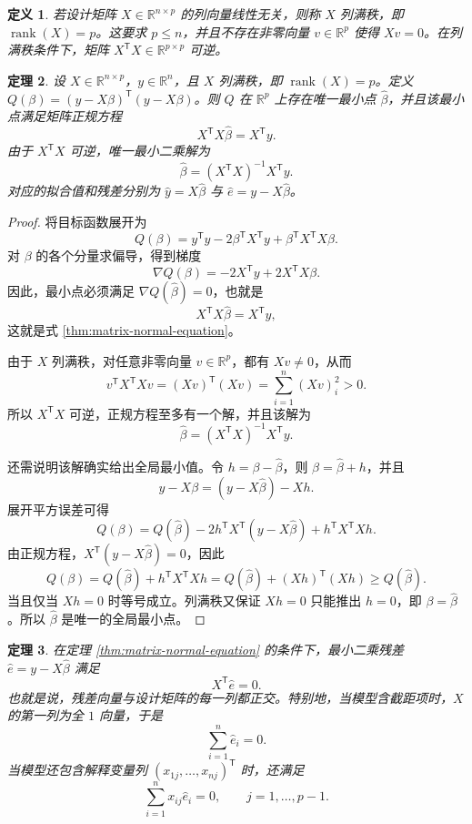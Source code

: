 \documentclass[UTF8,fontset=fandol,11pt]{ctexart}
\newtheorem{definition}{定义}[section]
\newtheorem{theorem}[definition]{定理}
\begin{document}
\begin{definition}
若设计矩阵 $X\in\mathbb{R}^{n\times p}$ 的列向量线性无关，则称 $X$ 列满秩，即 $\operatorname{rank}(X)=p$。这要求 $p\leq n$，并且不存在非零向量 $v\in\mathbb{R}^{p}$ 使得 $Xv=0$。在列满秩条件下，矩阵 $X^{\mathsf T}X\in\mathbb{R}^{p\times p}$ 可逆。
\end{definition}
\begin{theorem}
\label{thm:unique-least-squares-solution}设 $X\in\mathbb{R}^{n\times p}$，$y\in\mathbb{R}^{n}$，且 $X$ 列满秩，即 $\operatorname{rank}(X)=p$。定义 $Q(\beta)=(y-X\beta)^{\mathsf T}(y-X\beta)$。则 $Q$ 在 $\mathbb{R}^{p}$ 上存在唯一最小点 $\hat\beta$，并且该最小点满足矩阵正规方程
\begin{equation}
X^{\mathsf T}X\hat\beta=X^{\mathsf T}y.
\label{thm:matrix-normal-equation}
\end{equation}
由于 $X^{\mathsf T}X$ 可逆，唯一最小二乘解为
\[
\hat\beta=(X^{\mathsf T}X)^{-1}X^{\mathsf T}y.
\]
对应的拟合值和残差分别为 $\hat y=X\hat\beta$ 与 $\hat e=y-X\hat\beta$。
\end{theorem}
\begin{proof}
将目标函数展开为
\[
Q(\beta)=y^{\mathsf T}y-2\beta^{\mathsf T}X^{\mathsf T}y+\beta^{\mathsf T}X^{\mathsf T}X\beta.
\]
对 $\beta$ 的各个分量求偏导，得到梯度
\[
\nabla Q(\beta)=-2X^{\mathsf T}y+2X^{\mathsf T}X\beta.
\]
因此，最小点必须满足 $\nabla Q(\hat\beta)=0$，也就是
\[
X^{\mathsf T}X\hat\beta=X^{\mathsf T}y,
\]
这就是式 \eqref{thm:matrix-normal-equation}。

由于 $X$ 列满秩，对任意非零向量 $v\in\mathbb{R}^{p}$，都有 $Xv\neq 0$，从而
\[
v^{\mathsf T}X^{\mathsf T}Xv=(Xv)^{\mathsf T}(Xv)=\sum_{i=1}^{n}(Xv)_i^2>0.
\]
所以 $X^{\mathsf T}X$ 可逆，正规方程至多有一个解，并且该解为
\[
\hat\beta=(X^{\mathsf T}X)^{-1}X^{\mathsf T}y.
\]

还需说明该解确实给出全局最小值。令 $h=\beta-\hat\beta$，则 $\beta=\hat\beta+h$，并且
\[
y-X\beta=(y-X\hat\beta)-Xh.
\]
展开平方误差可得
\[
Q(\beta)=Q(\hat\beta)-2h^{\mathsf T}X^{\mathsf T}(y-X\hat\beta)+h^{\mathsf T}X^{\mathsf T}Xh.
\]
由正规方程，$X^{\mathsf T}(y-X\hat\beta)=0$，因此
\[
Q(\beta)=Q(\hat\beta)+h^{\mathsf T}X^{\mathsf T}Xh
=Q(\hat\beta)+(Xh)^{\mathsf T}(Xh)\geq Q(\hat\beta).
\]
当且仅当 $Xh=0$ 时等号成立。列满秩又保证 $Xh=0$ 只能推出 $h=0$，即 $\beta=\hat\beta$。所以 $\hat\beta$ 是唯一的全局最小点。
\end{proof}
\begin{theorem}
在定理 \eqref{thm:matrix-normal-equation} 的条件下，最小二乘残差 $\hat e=y-X\hat\beta$ 满足
\[
X^{\mathsf T}\hat e=0.
\]
也就是说，残差向量与设计矩阵的每一列都正交。特别地，当模型含截距项时，$X$ 的第一列为全 $1$ 向量，于是
\[
\sum_{i=1}^{n}\hat e_i=0.
\]
当模型还包含解释变量列 $(x_{1j},\ldots,x_{nj})^{\mathsf T}$ 时，还满足
\[
\sum_{i=1}^{n}x_{ij}\hat e_i=0,
\qquad j=1,\ldots,p-1.
\]
\end{theorem}
\end{document}
